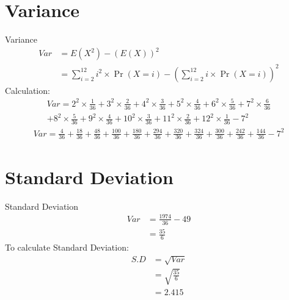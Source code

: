 \documentclass{beamer}
\providecommand{\pr}[1]{\ensuremath{\Pr\left(#1\right)}}
\providecommand{\pr}[1]{\ensuremath{\Pr\left(#1\right)}}
\begin{document}
\section{Variance}
\begin{frame}{Variance}
\begin{align}
    Var &= E(X^2) - (E(X))^2\\
    &= \sum_{i=2}^{12} i^2\times \pr{X=i} - (\sum_{i=2}^{12} i\times \pr{X=i})^2
\end{align}
Calculation:
\begin{multline}
    Var = 2^2 \times \frac{1}{36} + 3^2 \times \frac{2}{36} + 4^2 \times \frac{3}{36} + 5^2 \times \frac{4}{36} + 6^2 \times \frac{5}{36}  + 7^2 \times \frac{6}{36} \\+ 8^2 \times \frac{5}{36} + 9^2 \times \frac{4}{36} + 10^2 \times \frac{3}{36} + 11^2 \times \frac{2}{36} + 12^2 \times \frac{1}{36} - 7^2
\end{multline}
\begin{multline}
    Var = \frac{4}{36} + \frac{18}{36} + \frac{48}{36} + \frac{100}{36} + \frac{180}{36} + \frac{294}{36} + \frac{320}{36} + \frac{324}{36} + \frac{300}{36} + \frac{242}{36} + \frac{144}{36} - 7^2
\end{multline}

    

\end{frame}

\section{Standard Deviation}
\begin{frame}{Standard Deviation}
\begin{align}
   Var &= \frac{1974}{36} - 49\\
    &= \frac{35}{6}
\end{align}
To calculate Standard Deviation:
\begin{align}
    S.D &= \sqrt{Var}\\
    &= \sqrt{\frac{35}{6}}\\
    &= 2.415
\end{align}
\end{frame}
\end{document}
